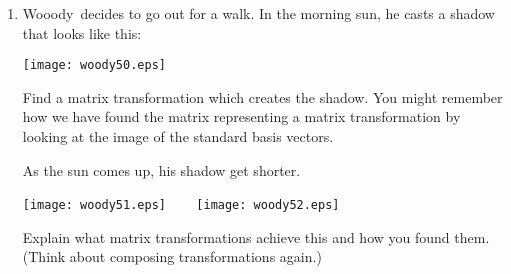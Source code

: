 \documentclass[12pt]{article}
\newcommand{\woody}{Wooody\ }
\begin{document}
\begin{enumerate}
  There are two ways to do this, but one is easy after a little
  thought.  The first two frames are rather straightforward.  The
  third is a little tricky but the diagram gives you another tool to
  help.  Once you have the diagram configured in some way you like,
  you may press the button {\bf Apply}, the image on the left is set
  to that on the right and the transformation reset to the identity.
  You may then operate on the new figure from scratch.
  (Mathematically, you are composing two functions.)

  Explain a simple way to make the sequence of frames above.  

  \vspace*{2in}

  Determine the function that takes our original picture of \woody into
  the final close up?

  \vspace*{1in}

  \newpage
  \item  \woody decides to go out for a walk.  In the morning sun,
    he casts a shadow that looks like this:
    
    \begin{center}
      \texttt{[image: woody50.eps]}
    \end{center}

    Find a matrix transformation which creates the
    shadow.  You might remember how we have found the matrix
    representing a matrix transformation by looking at the image of
    the standard basis vectors.

    \vspace*{1in}

    As the sun comes up, his shadow get shorter.

    \begin{center}
      \texttt{[image: woody51.eps]} ~~~
      \texttt{[image: woody52.eps]}
    \end{center}

    Explain what matrix transformations achieve this and how you found
    them.  (Think about composing transformations again.)

    \vspace*{1.15in}


      

\end{enumerate}
\end{document}
